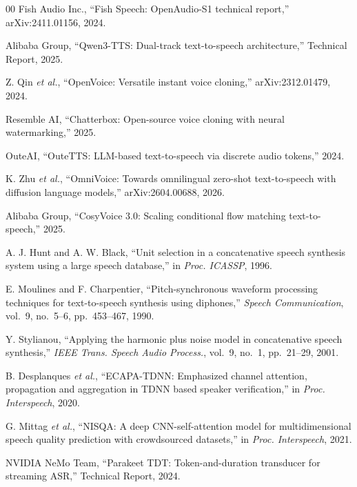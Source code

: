 \documentclass[conference]{IEEEtran}
\begin{document}
\begin{thebibliography}{00}
 Fish Audio Inc., ``Fish Speech: OpenAudio-S1 technical report,'' arXiv:2411.01156, 2024.

 Alibaba Group, ``Qwen3-TTS: Dual-track text-to-speech architecture,'' Technical Report, 2025.

 Z. Qin \emph{et al.}, ``OpenVoice: Versatile instant voice cloning,'' arXiv:2312.01479, 2024.

 Resemble AI, ``Chatterbox: Open-source voice cloning with neural watermarking,'' 2025.

 OuteAI, ``OuteTTS: LLM-based text-to-speech via discrete audio tokens,'' 2024.

 K. Zhu \emph{et al.}, ``OmniVoice: Towards omnilingual zero-shot text-to-speech with diffusion language models,'' arXiv:2604.00688, 2026.

 Alibaba Group, ``CosyVoice 3.0: Scaling conditional flow matching text-to-speech,'' 2025.

 A. J. Hunt and A. W. Black, ``Unit selection in a concatenative speech synthesis system using a large speech database,'' in \emph{Proc. ICASSP}, 1996.

 E. Moulines and F. Charpentier, ``Pitch-synchronous waveform processing techniques for text-to-speech synthesis using diphones,'' \emph{Speech Communication}, vol.~9, no.~5--6, pp.~453--467, 1990.

 Y. Stylianou, ``Applying the harmonic plus noise model in concatenative speech synthesis,'' \emph{IEEE Trans. Speech Audio Process.}, vol.~9, no.~1, pp.~21--29, 2001.

 B. Desplanques \emph{et al.}, ``ECAPA-TDNN: Emphasized channel attention, propagation and aggregation in TDNN based speaker verification,'' in \emph{Proc. Interspeech}, 2020.

 G. Mittag \emph{et al.}, ``NISQA: A deep CNN-self-attention model for multidimensional speech quality prediction with crowdsourced datasets,'' in \emph{Proc. Interspeech}, 2021.

 NVIDIA NeMo Team, ``Parakeet TDT: Token-and-duration transducer for streaming ASR,'' Technical Report, 2024.

\end{thebibliography}
\end{document}
